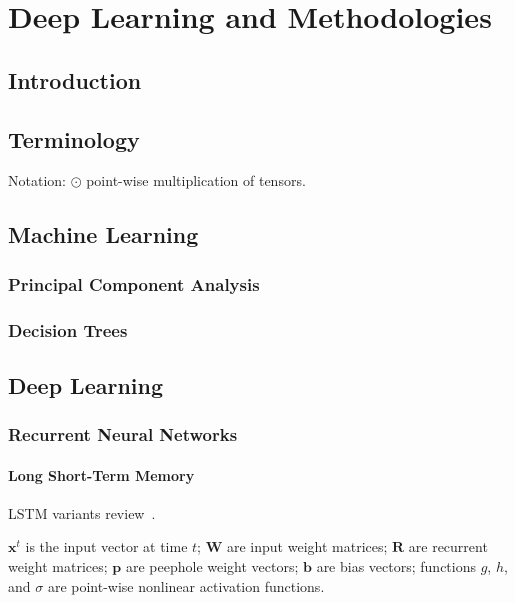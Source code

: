 \chapter{Deep Learning and Methodologies}
\label{chap:background}

\section{Introduction}

\section{Terminology}

Notation: $\odot$ point-wise multiplication of tensors.

\section{Machine Learning}

\subsection{Principal Component Analysis}

\subsection{Decision Trees}

\section{Deep Learning}

\subsection{Recurrent Neural Networks}

\subsubsection{Long Short-Term Memory}

LSTM variants review~\cite{Greff2015}.

$\bm{x}^t$ is the input vector at time $t$; $\bm{W}$ are input weight matrices; $\bm{R}$ are recurrent weight matrices; $\bm{p}$ are peephole weight vectors; $\bm{b}$ are bias vectors; functions $g$, $h$, and $\sigma$ are point-wise nonlinear activation functions.

